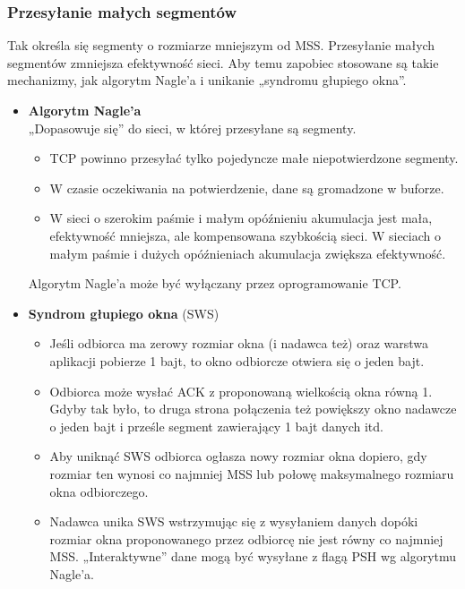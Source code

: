 \documentclass[../main.tex]{subfiles}
\begin{document}
    \subsubsection{Przesyłanie małych segmentów}
    Tak określa się segmenty o rozmiarze mniejszym od MSS.
    Przesyłanie małych segmentów zmniejsza efektywność sieci.
    Aby temu zapobiec stosowane są takie mechanizmy, jak algorytm Nagle’a i unikanie
    „syndromu głupiego okna”.
    \begin{itemize}
        \item \textbf{Algorytm Nagle’a}\\
        „Dopasowuje się” do sieci, w której przesyłane są segmenty.
        \begin{itemize}
            \item TCP powinno przesyłać tylko pojedyncze małe niepotwierdzone segmenty.
            \item W czasie oczekiwania na potwierdzenie, dane są gromadzone w buforze.
            \item W sieci o szerokim paśmie i małym opóźnieniu akumulacja jest mała, efektywność
            mniejsza, ale kompensowana szybkością sieci. W sieciach o małym paśmie i dużych
            opóźnieniach akumulacja zwiększa efektywność.
        \end{itemize}
        Algorytm Nagle’a może być wyłączany przez oprogramowanie TCP.
        \item \textbf{Syndrom głupiego okna} (SWS)\\
        \begin{itemize}
            \item Jeśli odbiorca ma zerowy rozmiar okna (i nadawca też) oraz warstwa aplikacji pobierze 1
            bajt, to okno odbiorcze otwiera się o jeden bajt.
            \item Odbiorca może wysłać ACK z proponowaną wielkością okna równą 1. Gdyby tak było, to
            druga strona połączenia też powiększy okno nadawcze o jeden bajt i prześle segment
            zawierający 1 bajt danych itd.
            \item Aby uniknąć SWS odbiorca ogłasza nowy rozmiar okna dopiero, gdy rozmiar ten wynosi co
            najmniej MSS lub połowę maksymalnego rozmiaru okna odbiorczego.
            \item Nadawca unika SWS wstrzymując się z wysyłaniem danych dopóki rozmiar okna proponowanego przez odbiorcę nie jest równy co najmniej MSS. „Interaktywne” dane mogą być wysyłane z flagą PSH wg algorytmu Nagle’a.
        \end{itemize}
    \end{itemize}
\end{document}
